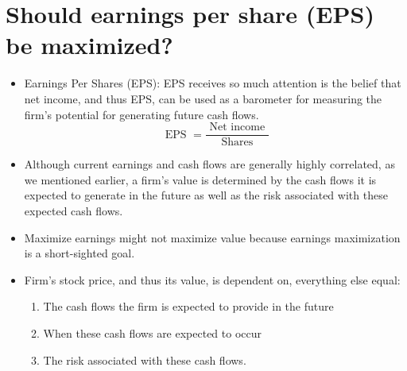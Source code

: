 \documentclass{article}
\begin{document}
\section{Should earnings per share (EPS) be maximized?}
\begin{itemize}
    \item Earnings Per Shares (EPS):  EPS receives so much attention is the belief that net income, and thus EPS, can be used as a barometer for measuring the firm’s potential for generating future cash flows.
        \[
          \text{ EPS } = \frac{\text{ Net income }}{\text{ Shares }}
        \]
    
    \item Although current earnings and cash flows are generally highly correlated, as we mentioned earlier, a firm’s value is determined by the cash flows it is expected to generate in the future as well as the risk associated with these expected cash flows. 
    \item Maximize earnings might not maximize value because earnings maximization is a short-sighted goal.
    \item Firm’s stock price, and thus its value, is dependent on, everything else equal:
        \begin{enumerate}
            \item The cash flows the firm is expected to provide in the future 
            \item When these cash flows are expected to occur 
            \item The risk associated with these cash flows. 
        \end{enumerate} 
\end{itemize}
\end{document}
